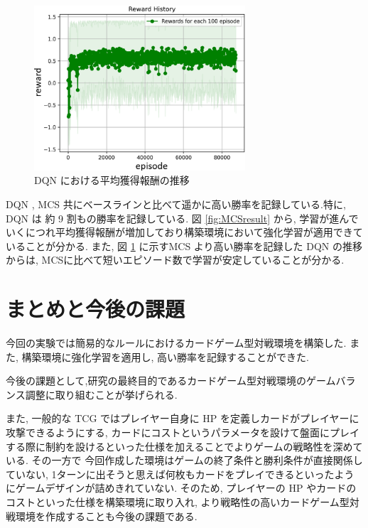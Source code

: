 \documentclass[twocolumn]{jarticle}     %
\begin{document}
  \begin{figure}[H]
    \centering
    \includegraphics[width=78.5mm]{assets/DQN_update.eps}
    \caption{DQN における平均獲得報酬の推移}
    \label{fig:DQNresult}
  \end{figure}
DQN , MCS 共にベースラインと比べて遥かに高い勝率を記録している.特に, DQN は 約 9 割もの勝率を記録している.
図 \ref{fig:MCSresult} から, 学習が進んでいくにつれ平均獲得報酬が増加しており構築環境において強化学習が適用できていることが分かる.
また, 図 \ref{fig:DQNresult} に示すMCS より高い勝率を記録した DQN の推移からは, MCSに比べて短いエピソード数で学習が安定していることが分かる.
  

\section{まとめと今後の課題}
今回の実験では簡易的なルールにおけるカードゲーム型対戦環境を構築した.
また, 構築環境に強化学習を適用し, 高い勝率を記録することができた.
\par
今後の課題として,研究の最終目的であるカードゲーム型対戦環境のゲームバランス調整に取り組むことが挙げられる.\par
また, 一般的な TCG ではプレイヤー自身に HP を定義しカードがプレイヤーに攻撃できるようにする, カードにコストというパラメータを設けて盤面にプレイする際に制約を設けるといった仕様を加えることでよりゲームの戦略性を深めている. その一方で
今回作成した環境はゲームの終了条件と勝利条件が直接関係していない, 1ターンに出そうと思えば何枚もカードをプレイできるといったようにゲームデザインが詰めきれていない. そのため, プレイヤーの HP やカードのコストといった仕様を構築環境に取り入れ, より戦略性の高いカードゲーム型対戦環境を作成することも今後の課題である.






\end{document}
